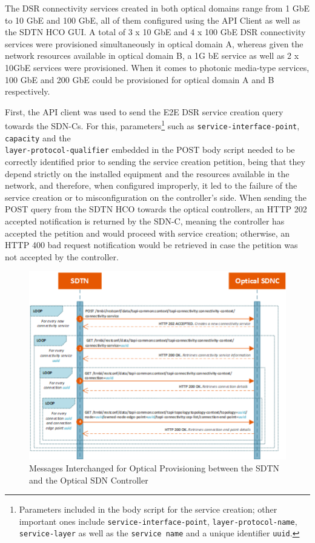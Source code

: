 \documentclass[a4paper,fleqn]{cas-dc}
\begin{document}
The DSR connectivity services created in both optical domains range from 1 GbE to 10 GbE and 100 GbE, all of them configured using the API Client as well as the SDTN HCO GUI. A total of 3 x 10 GbE and 4 x 100 GbE DSR connectivity services were provisioned simultaneously  in optical domain A, whereas given the network resources available in optical domain B, a 1G bE service as well as 2 x 10GbE services were provisioned. When it comes to photonic media-type services, 100 GbE and 200 GbE could be provisioned for optical domain A and B respectively. 

First, the API client was used to send the E2E DSR service creation query towards the SDN-Cs. For this, parameters\footnote{Parameters included in the body script for the service creation; other important ones include \texttt{service-interface-point}, \texttt{layer-protocol-name}, \texttt{service-layer} as well as the \texttt{service name} and a unique identifier \texttt{uuid}.} such as \texttt{service-interface-point}, \texttt{capacity} and the \\ \texttt{layer-protocol-qualifier} embedded in the POST body script needed to be correctly identified prior to sending the service creation petition, being that they depend strictly on the installed equipment and the resources available in the network, and therefore, when configured improperly, it led to the failure of the service creation or to  misconfiguration on the controller’s side. When sending the POST query from the SDTN HCO towards the optical controllers, an HTTP 202 accepted notification is returned by the SDN-C, meaning the controller has accepted the petition and would proceed with service creation; otherwise, an HTTP 400 bad request notification would be retrieved in case the petition was not accepted by the controller. 

\begin{figure}
	\centering
		\includegraphics[width=\linewidth]{figs/optical_provisioning_workflow_2.png}
	\caption{Messages Interchanged for Optical Provisioning between the SDTN and the Optical SDN Controller}
	\label{FIG:optical_provisioning_workflow}
\end{figure}
\end{document}
